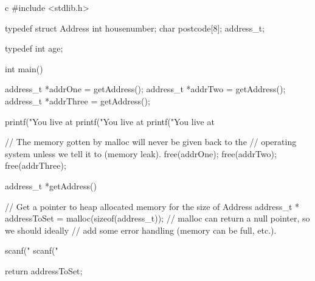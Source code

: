 \begin{code}{c}
    #include <stdlib.h>

    typedef struct Address {
        int housenumber;
        char postcode[8];
    } address_t;

    typedef int age;

    int main() {
        address_t *addrOne = getAddress();
        address_t *addrTwo = getAddress();
        address_t *addrThree = getAddress();

        printf("You live at %
        printf("You live at %
        printf("You live at %

        // The memory gotten by malloc will never be given back to the 
        // operating system unless we tell it to (memory leak).
        free(addrOne);
        free(addrTwo);
        free(addrThree);
    }

    address_t *getAddress() {
        // Get a pointer to heap allocated memory for the size of Address
        address_t * addressToSet = malloc(sizeof(address_t));
        // malloc can return a null pointer, so we should ideally
        // add some error handling (memory can be full, etc.).

        scanf("%
        scanf("%

        return addressToSet;
    }
\end{code}
